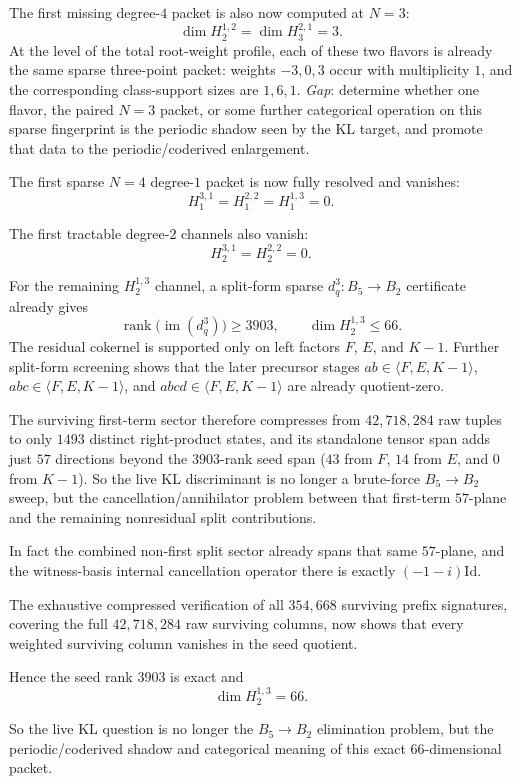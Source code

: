 \begin{remark}
The first missing degree-$4$ packet is
also now computed at $N=3$:
\[
\dim H^{1,2}_2
=
\dim H^{2,1}_3
=
3.
\]
At the level of the total root-weight profile, each of these two flavors
is already the same sparse three-point packet: weights $-3,0,3$ occur
with multiplicity $1$, and the corresponding class-support sizes are
$1,6,1$.  \emph{Gap}: determine whether one flavor, the paired
$N=3$ packet, or some further categorical operation on this sparse
fingerprint is the periodic shadow seen by the KL target, and promote
that data to the periodic/coderived enlargement.

The first sparse $N=4$ degree-$1$
packet is now fully resolved and vanishes:
\[
H^{3,1}_1 = H^{2,2}_1 = H^{1,3}_1 = 0.
\]

The first tractable degree-$2$ channels also vanish:
\[
H^{3,1}_2 = H^{2,2}_2 = 0.
\]

For the remaining $H^{1,3}_2$ channel, a split-form sparse
$d_q^3\colon B_5\to B_2$ certificate already gives
\[
\operatorname{rank}\bigl(\operatorname{im}(d_q^3)\bigr)\ge 3903,
\qquad
\dim H^{1,3}_2 \le 66.
\]
The residual cokernel is supported only on left factors
$F$, $E$, and $K-1$.  Further split-form screening shows that the
later precursor stages $ab\in\langle F,E,K-1\rangle$,
$abc\in\langle F,E,K-1\rangle$, and
$abcd\in\langle F,E,K-1\rangle$ are already quotient-zero.

The surviving first-term sector therefore compresses from
$42{,}718{,}284$ raw tuples to only $1493$ distinct right-product
states, and its standalone tensor span adds just $57$ directions
beyond the $3903$-rank seed span \textup{(}$43$ from $F$, $14$ from
$E$, and $0$ from $K-1$\textup{)}.  So the live KL discriminant is no
longer a brute-force $B_5 \to B_2$ sweep, but the
cancellation/annihilator problem between that first-term $57$-plane
and the remaining nonresidual split contributions.

In fact the combined non-first split sector already spans that same
$57$-plane, and the witness-basis internal cancellation operator there
is exactly $(-1-i)\mathrm{Id}$.

The exhaustive compressed
verification of all $354{,}668$ surviving prefix signatures, covering
the full $42{,}718{,}284$ raw surviving columns, now shows that every
weighted surviving column vanishes in the seed quotient.

Hence the
seed rank $3903$ is exact and
\[
\dim H^{1,3}_2 = 66.
\]

So the live KL question is no longer the
$B_5 \to B_2$ elimination problem, but the periodic/coderived shadow
and categorical meaning of this exact $66$-dimensional packet.


\end{remark}
